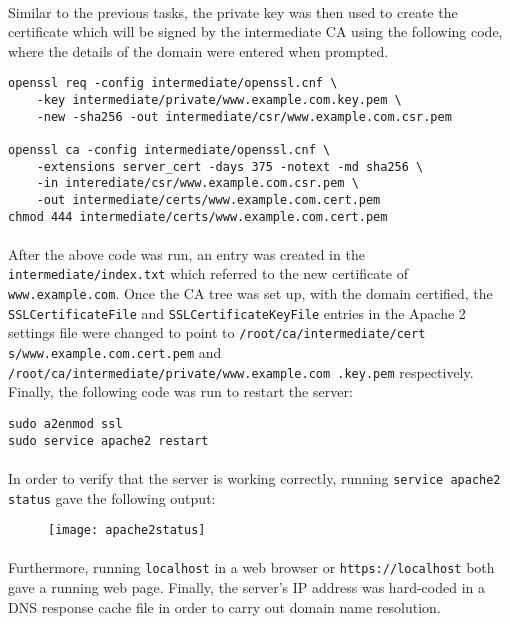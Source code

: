 \paragraph{ }Similar to the previous tasks, the private key was then used to create the certificate which will be signed by the intermediate CA using the following code, where the details of the domain were entered when prompted.

\begin{verbatim}
openssl req -config intermediate/openssl.cnf \
    -key intermediate/private/www.example.com.key.pem \
    -new -sha256 -out intermediate/csr/www.example.com.csr.pem

openssl ca -config intermediate/openssl.cnf \
    -extensions server_cert -days 375 -notext -md sha256 \
    -in interediate/csr/www.example.com.csr.pem \
    -out intermediate/certs/www.example.com.cert.pem
chmod 444 intermediate/certs/www.example.com.cert.pem
\end{verbatim}

\paragraph{ }After the above code was run, an entry was created in the \texttt{intermediate/index.txt} which referred to the new certificate of \texttt{www.example.com}. Once the CA tree was set up, with the domain certified, the \texttt{SSLCertificateFile} and \texttt{SSLCertificateKeyFile} entries in the Apache 2 settings file were changed to point to \texttt{/root/ca/intermediate/cert s/www.example.com.cert.pem} and \texttt{/root/ca/intermediate/private/www.example.com .key.pem} respectively. Finally, the following code was run to restart the server:

\begin{verbatim}
sudo a2enmod ssl
sudo service apache2 restart
\end{verbatim}

\paragraph{ }In order to verify that the server is working correctly, running \texttt{service apache2 status} gave the following output:

\begin{figure}[!h]
	\centering
	\texttt{[image: apache2status]}
\end{figure}

\paragraph{ }Furthermore, running \texttt{localhost} in a web browser or \texttt{https://localhost} both gave a running web page. Finally, the server's IP address was hard-coded in a DNS response cache file in order to carry out domain name resolution.


